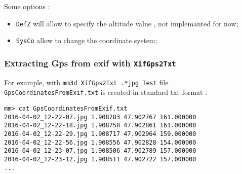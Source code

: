 Some options :

\begin{itemize}
   \item {\tt DefZ} will allow to specify the altitude value , not implemanted for now;

   \item {\tt SysCo}  allow to change the coordinate system;

\end{itemize}

\subsubsection{Extracting Gps from exif with {\tt XifGps2Txt}}

For example, with {\tt mm3d XifGps2Txt .*jpg Test}   file {\tt GpsCoordinatesFromExif.txt}
is created in standard txt format :

\begin{verbatim}
mm> cat GpsCoordinatesFromExif.txt
2016-04-02_12-22-07.jpg 1.908783 47.902767 161.000000 
2016-04-02_12-22-18.jpg 1.908758 47.902861 161.000000 
2016-04-02_12-22-29.jpg 1.908717 47.902964 159.000000 
2016-04-02_12-22-56.jpg 1.908556 47.902828 154.000000 
2016-04-02_12-23-07.jpg 1.908506 47.902789 157.000000 
2016-04-02_12-23-12.jpg 1.908511 47.902722 157.000000 
...
\end{verbatim}











